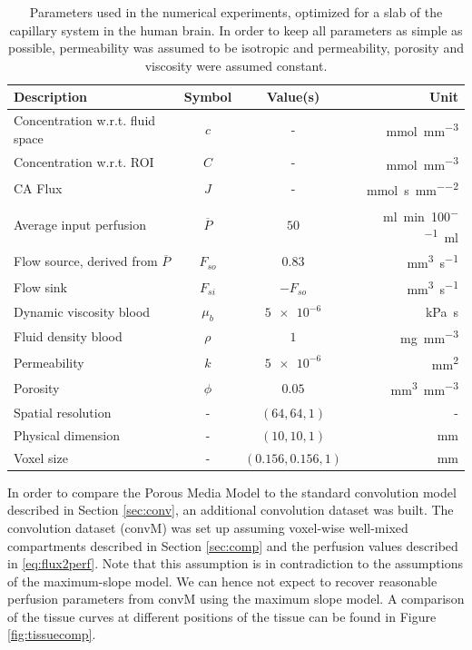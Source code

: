 \documentclass[paper=a4, fontsize=11pt,parskip=half,headings=small]{scrartcl}
\newcommand{\siJ}{\milli\mol\per\second\per\milli\meter\squared}
\newcommand{\sic}{\milli\mol\per\milli\meter\cubed}
\newcommand{\siPn}{\milli\litre\per\minute\per100\milli\litre}
\begin{document}
	\begin{table}[H]
		\centering
	  \caption{Parameters used in the numerical experiments, optimized for a slab of the capillary system in the human brain. In order to keep all parameters as simple as possible, permeability was assumed to be isotropic and permeability, porosity and viscosity were assumed constant.}		
		\begin{tabular}{ l  c  c  r }
		    Description 									& Symbol 			& Value(s) 				& Unit 				\\
			\toprule
			Concentration w.r.t. fluid space				& $c$				& - 					& \si{\sic} 		\\
			Concentration w.r.t. ROI						& $C$				& - 					& \si{\sic} 		\\
			CA Flux											& $J$				& - 					& \si{\siJ} 		\\
		    Average input perfusion 				 		& $\overline{P}$ 	& $50$ 					& \si{\siPn}		\\
			Flow source, derived from $\overline{P}$ 		& $F_{so}$ 			& \num{0.83}			& \si{\cubic\milli\meter\per\second} \\
			Flow sink 										& $F_{si}$ 			& $-F_{so}$ 		 	& \si{\cubic\milli\meter\per\second}  		\\
			Dynamic viscosity blood \cite{rosencranz06} 	& $\mu_b$ 			& $\num{5e-6}$ 			& \si{\kilo\pascal\second}  	\\
			Fluid density blood \cite{kenner89} 			& $\rho$ 			& $\num{1}$				& \si{\milli\gram\per\cubic\milli\meter} 		\\		
			Permeability  									& $k$ 				& $\num{5e-6}$ 			& \si{\square\milli\meter} 			\\	
			Porosity\cite{wu03}								& $\phi$ 			& $0.05$ 				& \si{\cubic\milli\meter\per\cubic\milli\meter}	\\	
			Spatial resolution 								& - 				& $(64,64,1)$ 			& -					\\
			Physical dimension 								& - 				& $(10,10,1)$ 			& \si{\milli\meter}				\\
			Voxel size 										& - 				& $(0.156,0.156,1)$ 	& \si{\milli\meter}	\\
	  \end{tabular}
	  \label{tab:par}
	\end{table}	
	
	In order to compare the Porous Media Model to the standard convolution model described in Section \ref{sec:conv}, an additional convolution dataset was built.
	The convolution dataset (convM) was set up assuming voxel-wise well-mixed compartments described in Section \ref{sec:comp} and the perfusion values described in \eqref{eq:flux2perf}.
	Note that this assumption is in contradiction to the assumptions of the maximum-slope model.
	We can hence not expect to recover reasonable perfusion parameters from convM using the maximum slope model.
	A comparison of the tissue curves at different positions of the tissue can be found in Figure \ref{fig:tissuecomp}. 
\end{document}
